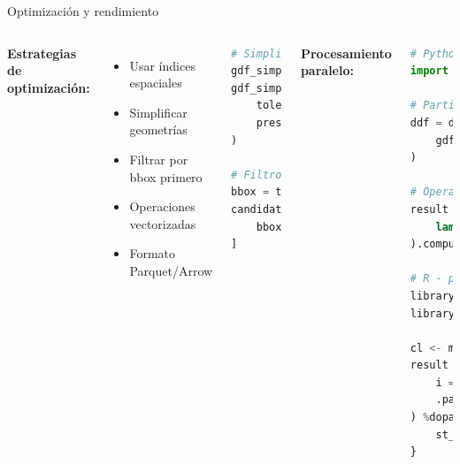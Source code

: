 \documentclass[10pt,aspectratio=169]{beamer}
\begin{document}
\begin{frame}[fragile]{Optimización y rendimiento}
    \begin{columns}[T]
        \textbf{Estrategias de optimización:}
        \begin{itemize}
            \item Usar índices espaciales
            \item Simplificar geometrías
            \item Filtrar por bbox primero
            \item Operaciones vectorizadas
            \item Formato Parquet/Arrow
        \end{itemize}
        
        \vspace{0.3cm}
        
        \begin{lstlisting}[language=Python]
# Simplificar geometrías
gdf_simple = gdf.copy()
gdf_simple.geometry = gdf.simplify(
    tolerance=10,  # metros
    preserve_topology=True
)

# Filtro por bbox antes de operación
bbox = target.total_bounds
candidates = source.cx[
    bbox[0]:bbox[2], bbox[1]:bbox[3]
]
        \end{lstlisting}
        
        \textbf{Procesamiento paralelo:}
        \begin{lstlisting}[language=Python]
# Python - Dask-GeoPandas
import dask_geopandas as dgpd

# Particionar datos
ddf = dgpd.from_geopandas(
    gdf, npartitions=4
)

# Operación paralela
result = ddf.map_partitions(
    lambda x: x.buffer(100)
).compute()

# R - parallel processing
library(parallel)
library(foreach)

cl <- makeCluster(4)
result <- foreach(
    i = 1:nrow(sf_obj),
    .packages = 'sf'
) %dopar% {
    st_buffer(sf_obj[i,], 100)
}
        \end{lstlisting}
    \end{columns}
\end{frame}
\end{document}
